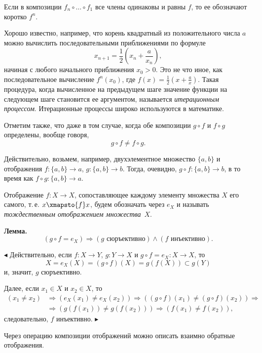 Если в композиции $f_n \circ \ldots \circ f_1$ все члены одинаковы и равны $f$, то ее обозначают коротко $f^n$.

Хорошо известно, например, что корень квадратный из положительного
числа $a$ можно вычислить последовательными приближениями по формуле
\[
  x_{n+1} = \frac{1}{2}\left(x_n + \frac{a}{x_n}\right),
\]
начиная с любого начального приближения $x_0 > 0$. Это не что иное, как последовательное вычисление $f^n(x_0)$, где $f(x) = \frac{1}{2}\left(x + \frac{a}{x}\right)$. Такая процедура,
когда вычисленное на предыдущем шаге значение функции на следующем
шаге становится ее аргументом, называется \textit{итерационным процессом}. Итерационные процессы широко используются в математике.

Отметим также, что даже в том случае, когда обе композиции $g \circ f$ и $f \circ g$
определены, вообще говоря,
\[
  g \circ f \neq f \circ g.
\]

Действительно, возьмем, например, двухэлементное множество $\{a, b\}$ и
отображения $f \colon \{a, b\} \to a$, $g \colon \{a, b\} \to b$. Тогда, очевидно, $g \circ f \colon \{a, b\} \to b$,
в то время как $f \circ g \colon \{a, b\} \to a$.

Отображение $f \colon X \to X$, сопоставляющее каждому элементу множества $X$
его самого, т.\,е. $x \xmapsto{f} x$, будем обозначать через $e_X$ и называть \textit{тождественным отображением множества}~$X$.

\medskip

\textbf{Лемма.}
\[
  (g \circ f = e_X) \Rightarrow (g \text{ сюръективно}) \land (f \text{ инъективно}).
\]

$\blacktriangleleft$ Действительно, если $f \colon X \to Y$, $g \colon Y \to X$ и $g \circ f = e_X \colon X \to X$, то
\[
  X = e_X(X) = (g \circ f)(X) = g(f(X)) \subset g(Y)
\]
и, значит, $g$ сюръективно.

Далее, если $x_1 \in X$ и $x_2 \in X$, то
\begin{align*}
  (x_1 \neq x_2) &\Rightarrow (e_X(x_1) \neq e_X(x_2)) \Rightarrow ((g \circ f)(x_1) \neq (g \circ f)(x_2)) \Rightarrow \\
  &\Rightarrow (g(f(x_1)) \neq g(f(x_2))) \Rightarrow (f(x_1) \neq f(x_2)),
\end{align*}
следовательно, $f$ инъективно. $\blacktriangleright$

\medskip

Через операцию композиции отображений можно описать взаимно обратные отображения.

\medskip


